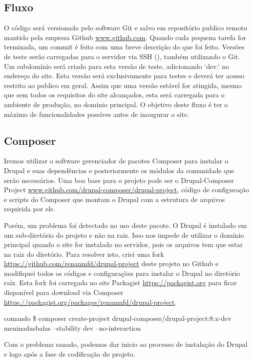 \subsection{Fluxo}
O código será versionado pelo software Git e salvo em repositório publico remoto mantido pela empresa Github \url{www.github.com}. Quando cada pequena tarefa for terminada, um commit é feito com uma breve descrição do que foi feito. Versões de teste serão carregadas para o servidor via SSH (\TODO), também utilizando o Git. Um subdomínio será criado para esta versão de teste, adicionando `dev.` no endereço do site. Esta versão será exclusivamente para testes e deverá ter acesso restrito ao publico em geral. Assim que uma versão estável for atingida, mesmo que sem todos os requisitos do site alcançados, esta será carregada para o ambiente de produção, no domínio principal. O objetivo deste fluxo é ter o máximo de funcionalidades possíves antes de inaugurar o site.

\subsection{Composer}
Iremos utilizar o software gerenciador de pacotes Composer para instalar o Drupal e suas dependências e posteriormente os módulos da comunidade que serão necessários. Uma boa base para o projeto pode ser o Drupal-Composer Project \url{www.github.com/drupal-composer/drupal-project}, código de configuração e scripts do Composer que montam o Drupal com a estrutura de arquivos requirida por ele.

Porém, um problema foi detectado no uso deste pacote. O Drupal é instalado em um sub-diretório do projeto e não na raiz. Isso nos impede de utilizar o domínio principal quando o site for instalado no servidor, pois os arquivos tem que estar na raiz do diretório. Para resolver isto, criei uma fork \TODO \url{https://github.com/renanmfd/drupal-project} deste projeto no Github e modifiquei todos os códigos e configurações para instalar o Drupal no diretório raíz. Esta \TODO fork foi carregada no site Packagist \url{https://packagist.org} para ficar disponível para download via Composer \url{https://packagist.org/packages/renanmfd/drupal-project}.

\TODO comando \$ composer create-project drupal-composer/drupal-project:8.x-dev meninadasbalas --stability dev --no-interaction

Com o problema sanado, podemos dar inicio ao processo de instalação do Drupal e logo após a fase de codificação do projeto.

